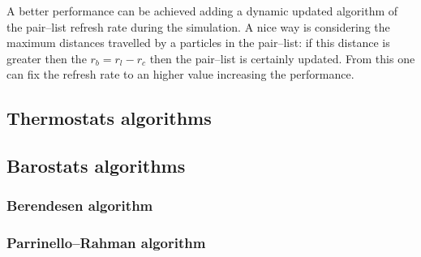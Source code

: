 A better performance can be achieved adding a dynamic updated algorithm of the pair--list refresh rate during the simulation. A nice way is considering the maximum distances travelled by a particles in the pair--list: if this distance is greater then the $r_b = r_l - r_c$ then the pair--list is certainly updated. From this one can fix the refresh rate to an higher value increasing the performance.


	\subsection{Thermostats algorithms} %
	\subsection{Barostats algorithms} %
		\subsubsection{Berendesen algorithm}

		\subsubsection{Parrinello--Rahman algorithm}

